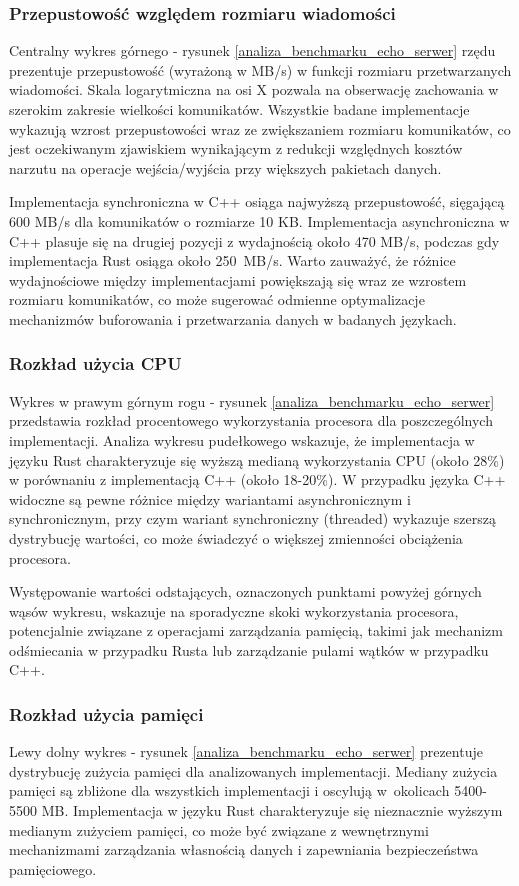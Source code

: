 \subsubsection{Przepustowość względem rozmiaru wiadomości}
Centralny wykres górnego - rysunek \ref{analiza_benchmarku_echo_serwer} rzędu prezentuje przepustowość (wyrażoną w MB/s) w funkcji rozmiaru przetwarzanych wiadomości. Skala logarytmiczna na osi X pozwala na obserwację zachowania w szerokim zakresie wielkości komunikatów. Wszystkie badane implementacje wykazują wzrost przepustowości wraz ze zwiększaniem rozmiaru komunikatów, co jest oczekiwanym zjawiskiem wynikającym z redukcji względnych kosztów narzutu na operacje wejścia/wyjścia przy większych pakietach danych.

Implementacja synchroniczna w C++ osiąga najwyższą przepustowość, sięgającą 600 MB/s dla komunikatów o rozmiarze 10 KB. Implementacja asynchroniczna w C++ plasuje się na drugiej pozycji z wydajnością około 470 MB/s, podczas gdy implementacja Rust osiąga około \mbox{250 MB/s}. Warto zauważyć, że różnice wydajnościowe między implementacjami powiększają się wraz ze wzrostem rozmiaru komunikatów, co może sugerować odmienne optymalizacje mechanizmów buforowania i przetwarzania danych w badanych językach.

\subsubsection{Rozkład użycia CPU}
Wykres w prawym górnym rogu - rysunek \ref{analiza_benchmarku_echo_serwer} przedstawia rozkład procentowego wykorzystania procesora dla poszczególnych implementacji. Analiza wykresu pudełkowego wskazuje, że implementacja w języku Rust charakteryzuje się wyższą medianą wykorzystania CPU (około 28\%) w porównaniu z implementacją C++ (około 18-20\%). W przypadku języka C++ widoczne są pewne różnice między wariantami asynchronicznym i synchronicznym, przy czym wariant synchroniczny (threaded) wykazuje szerszą dystrybucję wartości, co może świadczyć o większej zmienności obciążenia procesora.

Występowanie wartości odstających, oznaczonych punktami powyżej górnych wąsów wykresu, wskazuje na sporadyczne skoki wykorzystania procesora, potencjalnie związane z operacjami zarządzania pamięcią, takimi jak mechanizm odśmiecania w przypadku Rusta lub zarządzanie pulami wątków w przypadku C++.

\subsubsection{Rozkład użycia pamięci}
Lewy dolny wykres - rysunek \ref{analiza_benchmarku_echo_serwer} prezentuje dystrybucję zużycia pamięci dla analizowanych implementacji. Mediany zużycia pamięci są zbliżone dla wszystkich implementacji i oscylują w~okolicach 5400-5500 MB. Implementacja w języku Rust charakteryzuje się nieznacznie wyższym medianym zużyciem pamięci, co może być związane z wewnętrznymi mechanizmami zarządzania własnością danych i zapewniania bezpieczeństwa pamięciowego.

